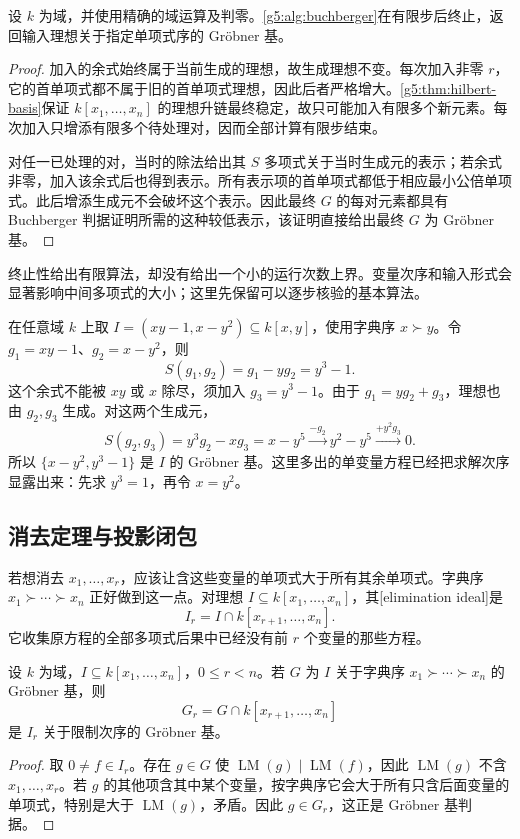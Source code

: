 \begin{proposition}\label{g5:prop:buchberger-termination}
	设 \(k\) 为域，并使用精确的域运算及判零。\cref{g5:alg:buchberger}在有限步后终止，返回输入理想关于指定单项式序的 Gröbner 基。
\end{proposition}
\begin{proof}
	加入的余式始终属于当前生成的理想，故生成理想不变。每次加入非零 \(r\)，它的首单项式都不属于旧的首单项式理想，因此后者严格增大。\cref{g5:thm:hilbert-basis}保证 \(k[x_1,\ldots,x_n]\) 的理想升链最终稳定，故只可能加入有限多个新元素。每次加入只增添有限多个待处理对，因而全部计算有限步结束。

	对任一已处理的对，当时的除法给出其 \(S\) 多项式关于当时生成元的表示；若余式非零，加入该余式后也得到表示。所有表示项的首单项式都低于相应最小公倍单项式。此后增添生成元不会破坏这个表示。因此最终 \(G\) 的每对元素都具有 Buchberger 判据证明所需的这种较低表示，该证明直接给出最终 \(G\) 为 Gröbner 基。
\end{proof}

终止性给出有限算法，却没有给出一个小的运行次数上界。变量次序和输入形式会显著影响中间多项式的大小；这里先保留可以逐步核验的基本算法。

\begin{example}\label{g5:exm:buchberger-three-points}
	在任意域 \(k\) 上取 \(I=(xy-1,x-y^2)\subseteq k[x,y]\)，使用字典序 \(x\succ y\)。令 \(g_1=xy-1\)、\(g_2=x-y^2\)，则
	\[
		S(g_1,g_2)=g_1-yg_2=y^3-1.
	\]
	这个余式不能被 \(xy\) 或 \(x\) 除尽，须加入 \(g_3=y^3-1\)。由于 \(g_1=yg_2+g_3\)，理想也由 \(g_2,g_3\) 生成。对这两个生成元，
	\[
		S(g_2,g_3)=y^3g_2-xg_3=x-y^5
		\xrightarrow{-g_2}y^2-y^5
		\xrightarrow{+y^2g_3}0.
	\]
	所以 \(\{x-y^2,y^3-1\}\) 是 \(I\) 的 Gröbner 基。这里多出的单变量方程已经把求解次序显露出来：先求 \(y^3=1\)，再令 \(x=y^2\)。
\end{example}

\subsection{消去定理与投影闭包}
\label{g5:subsec:0104:03}
若想消去 \(x_1,\ldots,x_r\)，应该让含这些变量的单项式大于所有其余单项式。字典序 \(x_1\succ\cdots\succ x_n\) 正好做到这一点。对理想 \(I\subseteq k[x_1,\ldots,x_n]\)，其[elimination ideal]是
\[
	I_r=I\cap k[x_{r+1},\ldots,x_n].
\]
它收集原方程的全部多项式后果中已经没有前 \(r\) 个变量的那些方程。

\begin{theorem}[消去定理]\label{g5:thm:elimination}
	设 \(k\) 为域，\(I\subseteq k[x_1,\ldots,x_n]\)，\(0\le r<n\)。若 \(G\) 为 \(I\) 关于字典序 \(x_1\succ\cdots\succ x_n\) 的 Gröbner 基，则
	\[
		G_r=G\cap k[x_{r+1},\ldots,x_n]
	\]
	是 \(I_r\) 关于限制次序的 Gröbner 基。
\end{theorem}
\begin{proof}
	取 \(0\ne f\in I_r\)。存在 \(g\in G\) 使 \(\operatorname{LM}(g)\mid\operatorname{LM}(f)\)，因此 \(\operatorname{LM}(g)\) 不含 \(x_1,\ldots,x_r\)。若 \(g\) 的其他项含其中某个变量，按字典序它会大于所有只含后面变量的单项式，特别是大于 \(\operatorname{LM}(g)\)，矛盾。因此 \(g\in G_r\)，这正是 Gröbner 基判据。
\end{proof}

